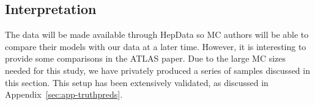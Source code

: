 \subsection{Interpretation}
\label{sec:gbb-interp}

The data will be made available through HepData so MC authors will be able to compare their models with our data at a later time.  However, it is interesting to provide some comparisons in the ATLAS paper.  Due to the large MC sizes needed for this study, we have privately produced a series of samples discussed in this section.  This setup has been extensively validated, as discussed in Appendix~\ref{sec:app-truthpreds}.  
